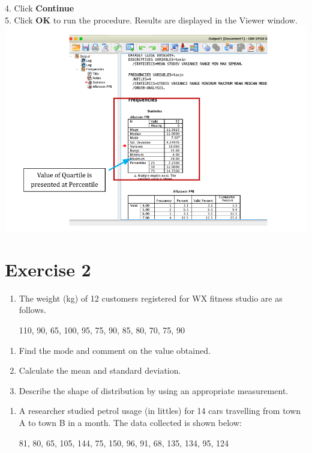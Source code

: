 \documentclass[
  a4paper,
  DIV=11,
  numbers=noendperiod,
  oneside]{scrreprt}
\providecommand{\tightlist}{%
  \setlength{\itemsep}{0pt}\setlength{\parskip}{0pt}}\usepackage{longtable,booktabs,array}
\begin{document}
4. Click \textbf{Continue}\\
5. Click \textbf{OK} to run the procedure. Results are displayed in the
Viewer window.\\
\includegraphics{images/ch2/picture22.png}\\

\hypertarget{exercise-2}{%
\section{Exercise 2}\label{exercise-2}}

\begin{enumerate}
\def\labelenumi{\arabic{enumi}.}
\tightlist
\item
  The weight (kg) of 12 customers registered for WX fitness studio are
  as follows.

  110, 90, 65, 100, 95, 75, 90, 85, 80, 70, 75, 90
\end{enumerate}

\begin{enumerate}
\def\labelenumi{\alph{enumi}.}
\tightlist
\item
  Find the mode and comment on the value obtained.
\item
  Calculate the mean and standard deviation.
\item
  Describe the shape of distribution by using an appropriate
  measurement.
\end{enumerate}

\begin{enumerate}
\def\labelenumi{\arabic{enumi}.}
\setcounter{enumi}{1}
\tightlist
\item
  A researcher studied petrol usage (in littles) for 14 cars travelling
  from town A to town B in a month. The data collected is shown below:

  81, 80, 65, 105, 144, 75, 150, 96, 91, 68, 135, 134, 95, 124
\end{enumerate}
\end{document}
